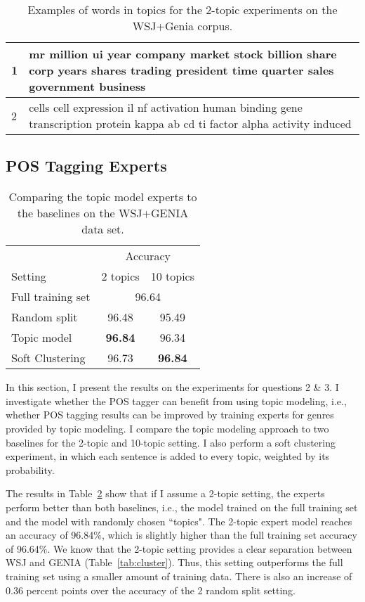 \begin{table}[t!]
	\begin{tabular}{l|p{14cm}} 
	    1 & mr million ui year company market stock billion share corp years shares trading president time quarter sales government business \\ \hline 
		2 & cells cell expression il nf activation human binding gene  transcription protein kappa ab cd ti factor alpha activity induced     \\ \hline
		
	\end{tabular}
	\caption{Examples of words in topics for the 2-topic experiments on the WSJ+Genia corpus.}
	\label{tab:ex:2topics}
\end{table}

\subsection{POS Tagging Experts}

\begin{table}[t]
\centering
\begin{tabular}{l|cc}
 & \multicolumn{2}{c}{Accuracy} \\
Setting & \multicolumn{1}{r}{2 topics} & \multicolumn{1}{r}{10 topics} \\ \hline
Full training set & \multicolumn{2}{c}{96.64} \\
Random split & 96.48 & 95.49 \\
Topic model & \textbf{96.84} & 96.34 \\
Soft Clustering & 96.73 & \textbf{96.84} \\ \hline
\end{tabular}
\caption{Comparing the topic model experts to the baselines on the WSJ+GENIA data set.\label{tab:mixedresults}}
\end{table}


In this section, I present the results on the experiments for questions 2 \& 3. I investigate whether the POS tagger can benefit from using topic modeling, i.e., whether POS tagging results can be improved by training experts for genres provided by topic modeling. I compare the topic modeling approach to  two baselines for the 2-topic and 10-topic setting. I also perform a soft clustering experiment, in which each sentence is added to every topic, weighted by its probability.

The results in Table~\ref{tab:mixedresults} show that if I assume a 2-topic setting, the experts perform better than both baselines, i.e., the model trained on the full training set and the model with randomly chosen ``topics". The 2-topic expert model reaches an accuracy of 96.84\%, which is slightly higher than the full training set accuracy of 96.64\%. We know that the 2-topic setting provides a clear separation between WSJ and GENIA (Table~\ref{tab:cluster}). Thus, this setting outperforms the full training set using a smaller amount of training data. There is also an increase of 0.36 percent points over the accuracy of the 2 random split setting. 

